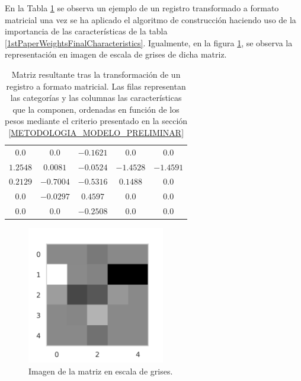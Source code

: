 En la Tabla \ref{ProcesoMatriz:Array} se observa un ejemplo de un registro transformado a formato matricial una vez se ha aplicado el algoritmo de construcción haciendo uso de la importancia de las características de la tabla \ref{1stPaperWeightsFinalCharacteristics}. Igualmente, en la figura \ref{ProcesoMatriz:VisualizacionDeMatriz}, se observa la representación en imagen de escala de grises de dicha matriz.


\begin{table}[H]
	\caption{Matriz resultante tras la transformación de un registro a formato matricial. Las filas representan las categorías y las columnas las características que la componen, ordenadas en función de los pesos mediante el criterio presentado en la sección \ref{METODOLOGIA_MODELO_PRELIMINAR}}
	\begin{center}
		\begin{tabular}{|c|c|c|c|c|}
			\hline
			$0.0$ & $0.0$ &  $-0.1621$  & $0.0$ & $0.0$\\
			$1.2548$ & $0.0081$ &  $-0.0524$  & $-1.4528$ & $-1.4591$\\
			$0.2129$ & $-0.7004$ &  $-0.5316$  & $0.1488$ & $0.0$\\
			$0.0$ & $-0.0297$ &  $0.4597$  & $0.0$ & $0.0$\\
			$0.0$ & $0.0$ &  $-0.2508$  & $0.0$ & $0.0$\\
			\hline
		\end{tabular}
	\end{center}

	\label{ProcesoMatriz:Array}
\end{table}

\begin{figure}[H]
	\centering
	\includegraphics[width=6cm]{Figures/TFM/accidente_fatal.png}
	\caption{Imagen de la matriz en escala de grises.}
	\label{ProcesoMatriz:VisualizacionDeMatriz}
\end{figure}


